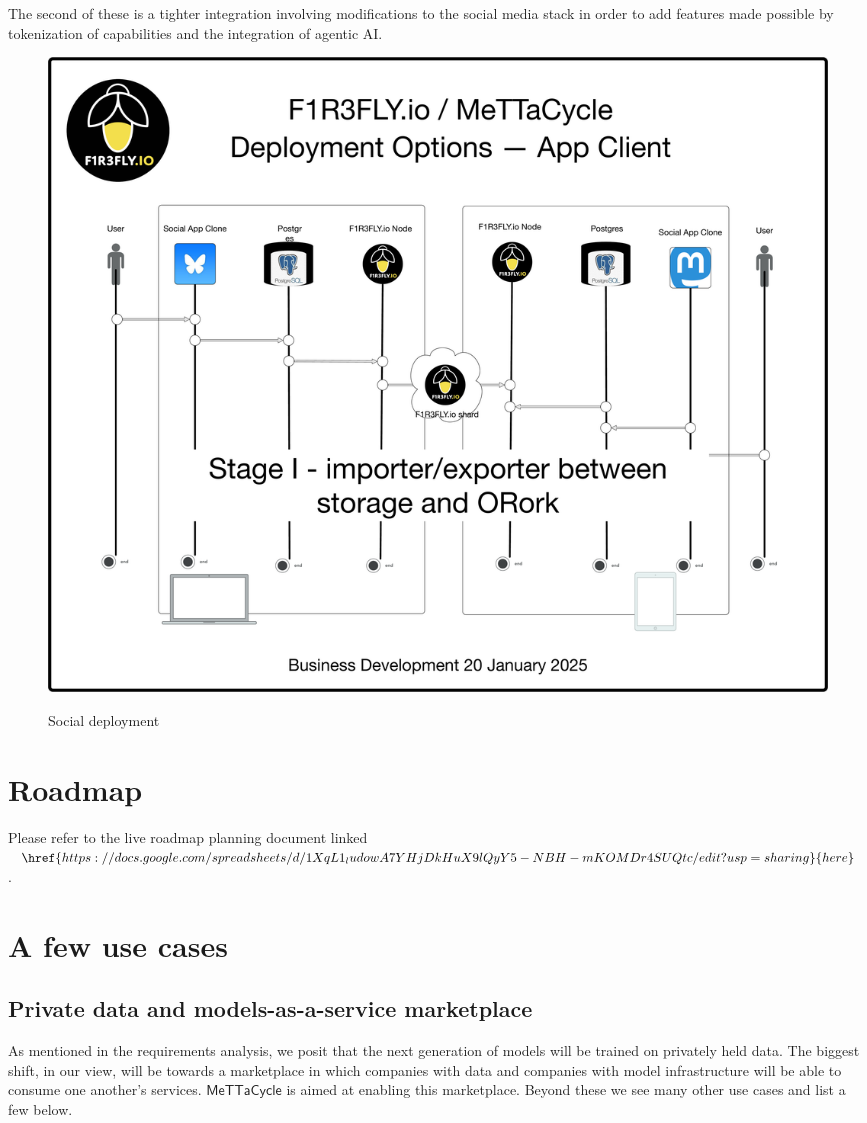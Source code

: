 \documentclass{article}
\newcommand{\MC}{\mathsf{MeTTaCycle}}
\begin{document}
The second of these is a tighter integration involving modifications
to the social media stack in order to add features made possible by
tokenization of capabilities and the integration of agentic AI.

\begin{figure}
  \centering
  \includegraphics[scale=0.15]{MeTTaCycleArchitecture2025SocialDeployment.pdf} \\
  \caption{Social deployment}
  \label{MCArch2025SocialDeployment}
\end{figure}

\section{Roadmap}

Please refer to the live roadmap planning document linked $\href{https://docs.google.com/spreadsheets/d/1XqL1_ludowA7YHjDkHuX9lQyY5-NBH-mKOMDr4SUQtc/edit?usp=sharing}{here}$.

\section{A few use cases}

\subsection{Private data and models-as-a-service marketplace}

As mentioned in the requirements analysis, we posit that the next
generation of models will be trained on privately held data. The
biggest shift, in our view, will be towards a marketplace in which
companies with data and companies with model infrastructure will be
able to consume one another's services. $\MC$ is aimed at enabling
this marketplace. Beyond these we see many other use cases and list a
few below.
\end{document}
